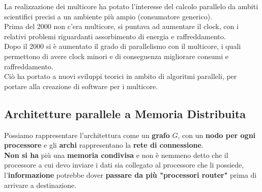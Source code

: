 	La realizzazione dei multicore ha potato l'interesse del calcolo parallelo da ambiti scientifici precisi a un ambiente più ampio (consumatore generico).\\
	
	Prima del 2000 non c'era multicore, si puntava ad aumentare il clock, con i relativi problemi riguardanti assorbimento di energia e raffreddamento.\\
	
	Dopo il 2000 si è aumentato il grado di parallelismo con il multicore, i quali permettono di avere clock minori e di conseguenza migliorare consumi e raffreddamento.\\
	
	Ciò ha portato a nuovi sviluppi teorici in ambito di algoritmi paralleli, per portare alla creazione di software per i multicore.\\
	
	\newpage
	
	\subsection{Architetture parallele a Memoria Distribuita}
	Possiamo rappresentare l'architettura come un \textbf{grafo} $G$, con un \textbf{nodo per ogni processore} e gli \textbf{archi} rappresentano la \textbf{rete di connessione}. \\
	
	\textbf{Non si ha} più una \textbf{memoria condivisa} e non è nemmeno detto che il processore a cui devo inviare i dati sia collegato al processore che li possiede, l'\textbf{informazione} potrebbe dover \textbf{passare da più "processori router"} prima di arrivare a destinazione.\\
	
